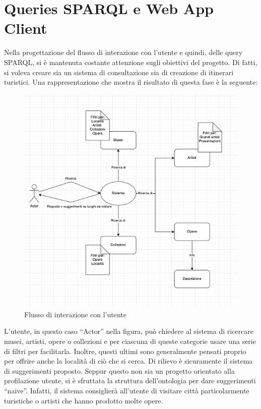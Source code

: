 \documentclass[12pt]{article}
\begin{document}
\section{Queries SPARQL e Web App Client}
Nella progettazione del flusso di interazione con l’utente e quindi, delle query SPARQL, si è mantenuta costante attenzione sugli obiettivi del progetto. Di fatti, si voleva creare sia un sistema di consultazione sia di creazione di itinerari turistici. 
Una rappresentazione che mostra il risultato di questa fase è la seguente:
\begin{figure}[!h]
   \centering
   \includegraphics[scale=0.6]{fig/flowchart interazione.png}
   \caption{Flusso di interazione con l'utente}\label{fig:picture}
\end{figure}

L’utente, in questo caso “Actor” nella figura, può chiedere al sistema di ricercare musei, artisti, opere o collezioni e per ciascuna di queste categorie usare una serie di filtri per facilitarla. Inoltre, questi ultimi sono generalmente pensati proprio per offrire anche la località di ciò che si cerca. Di rilievo è sicuramente il sistema di suggerimenti proposto. Seppur questo non sia un progetto orientato alla profilazione utente, si è sfruttata la struttura dell’ontologia per dare suggerimenti “naive”. Infatti, il sistema consiglierà all’utente di visitare città particolarmente turistiche o artisti che hanno prodotto molte opere.
\end{document}
